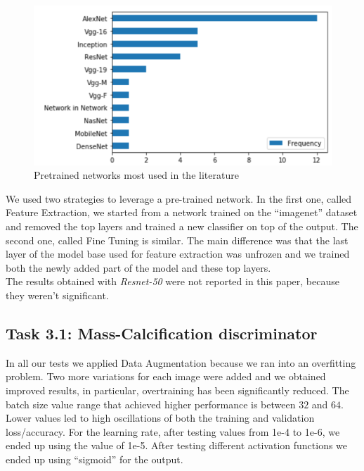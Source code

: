 \documentclass[11pt,a4paper,oneside]{article}
\begin{document}
\begin{figure}[h]
\centering
\includegraphics[width=.5\textwidth]{images/pretrained_networks}
\caption{Pretrained networks most used in the literature}
\label{fig:pretrained_networks}
\end{figure}

We used two strategies to leverage a pre-trained network. In the first one, called Feature Extraction, we started from a network trained on the “imagenet” dataset and removed the top layers and trained a new classifier on top of the output.
The second one, called Fine Tuning is similar. The main difference was that the last layer of the model base used for feature extraction was unfrozen and we trained both the newly added part of the model and these top layers. \\
The results obtained with \textit{Resnet-50} were not reported in this paper, because they weren't significant.

\subsection{Task 3.1: Mass-Calcification discriminator}
In all our tests we applied Data Augmentation because we ran into an overfitting problem. Two more variations for each image were added and we obtained improved results, in particular, overtraining has been significantly reduced. The batch size value range that achieved higher performance is between $32$ and $64$. Lower values led to high oscillations of both the training and validation loss/accuracy. For the learning rate, after testing values from 1e-4 to 1e-6, we ended up using the value of 1e-5. After testing different activation functions we ended up using “sigmoid” for the output. 
\end{document}
